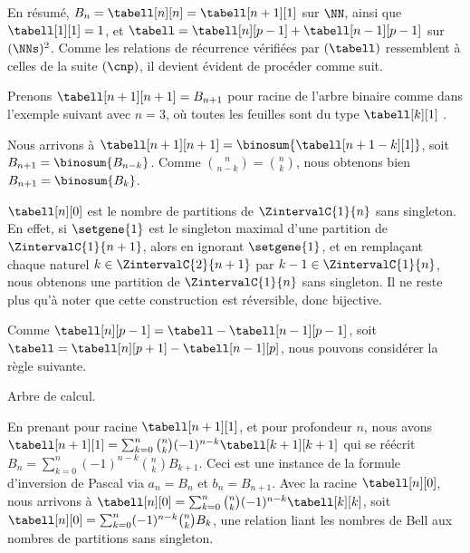 En résumé,
$B_n = \tabell[n][n] = \tabell[n+1][1]$ sur $\NN$,
ainsi que
$\tabell[1][1] = 1$,
et
$\tabell = \tabell[n][p-1] + \tabell[n-1][p-1]$ sur $(\NNs)^2$.
%
Comme les relations de récurrence vérifiées par $(\tabell)$ ressemblent à celles de la suite $(\cnp)$,
il devient évident de procéder comme suit.

\explaintree{\tabell}{\tabell[n-1][p-1]}{\tabell[n][p-1]}%
            {\bellintertree}{}

Prenons $\tabell[n+1][n+1] = B_{n+1}$ pour racine de l'arbre binaire comme dans l'exemple suivant avec $n = 3$,
où toutes les feuilles sont du type $\tabell[k][1]$ .


Nous arrivons à
$\tabell[n+1][n+1] = \binosum{\tabell[n+1-k][1]}$,
soit
$B_{n+1} = \binosum{B_{n-k}}$.
Comme $\binom{n}{n-k} = \binom{n}{k}$, nous obtenons bien
$B_{n+1} = \binosum{B_k}$.




\begin{remark} \label{val-bell-n-0}
    $\tabell[n][0]$ est le nombre de partitions de $\ZintervalC{1}{n}$ sans singleton.
    En effet,
    si $\setgene{1}$ est le singleton maximal d'une partition de $\ZintervalC{1}{n+1}$,
    alors
    en ignorant $\setgene{1}$,
    et
    en remplaçant chaque naturel $k \in \ZintervalC{2}{n+1}$ par $k-1 \in \ZintervalC{1}{n}$, nous obtenons une partition de $\ZintervalC{1}{n}$ sans singleton.
    Il ne reste plus qu'à noter que cette construction est réversible, donc bijective.
\end{remark}




\begin{remark}
    Comme $\tabell[n][p-1] = \tabell - \tabell[n-1][p-1]$,
    soit $\tabell = \tabell[n][p+1] - \tabell[n-1][p]$,
    nous pouvons considérer la règle suivante.

    \begin{center}
        \itshape\centering

        \calctree{\tabell}{\tabell[n][p+1]}{-\tabell[n-1][p]}

        Arbre de calcul.
    \end{center}

    En prenant pour racine $\tabell[n+1][1]$, et pour profondeur $n$,
    nous avons
    $\tabell[n+1][1] = \sum_{k=0}^n \binom{n}{k} (-1)^{n-k} \tabell[k+1][k+1]$
    qui se réécrit
    $B_n = \sum_{k=0}^n (-1)^{n-k} \binom{n}{k} B_{k+1}$.
    Ceci est une instance de la formule d'inversion de Pascal via
    $a_n = B_n$
    et
    $b_n = B_{n+1}$.
    Avec la racine $\tabell[n][0]$,
    nous arrivons à
    $\tabell[n][0] = \sum_{k=0}^n \binom{n}{k} (-1)^{n-k} \tabell[k][k]$,
    soit
    $\tabell[n][0] = \sum_{k=0}^n (-1)^{n-k} \binom{n}{k} B_{k}$,
    une relation liant les nombres de Bell aux nombres de partitions sans singleton.
\end{remark}
